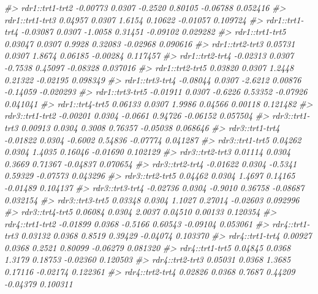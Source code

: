 \documentclass[
]{book}
\newenvironment{Shaded}{\begin{snugshade}}{\end{snugshade}}
\newcommand{\CommentTok}[1]{\textcolor[rgb]{0.56,0.35,0.01}{\textit{#1}}}
\begin{document}
\begin{Shaded}
\begin{Highlighting}[]
\CommentTok{\#\textgreater{} rdr1::trt1{-}trt2 {-}0.00773 0.0307 {-}0.2520 0.80105 {-}0.06788  0.052416}
\CommentTok{\#\textgreater{} rdr1::trt1{-}trt3  0.04957 0.0307  1.6154 0.10622 {-}0.01057  0.109724}
\CommentTok{\#\textgreater{} rdr1::trt1{-}trt4 {-}0.03087 0.0307 {-}1.0058 0.31451 {-}0.09102  0.029282}
\CommentTok{\#\textgreater{} rdr1::trt1{-}trt5  0.03047 0.0307  0.9928 0.32083 {-}0.02968  0.090616}
\CommentTok{\#\textgreater{} rdr1::trt2{-}trt3  0.05731 0.0307  1.8674 0.06185 {-}0.00284  0.117457}
\CommentTok{\#\textgreater{} rdr1::trt2{-}trt4 {-}0.02313 0.0307 {-}0.7538 0.45097 {-}0.08328  0.037016}
\CommentTok{\#\textgreater{} rdr1::trt2{-}trt5  0.03820 0.0307  1.2448 0.21322 {-}0.02195  0.098349}
\CommentTok{\#\textgreater{} rdr1::trt3{-}trt4 {-}0.08044 0.0307 {-}2.6212 0.00876 {-}0.14059 {-}0.020293}
\CommentTok{\#\textgreater{} rdr1::trt3{-}trt5 {-}0.01911 0.0307 {-}0.6226 0.53352 {-}0.07926  0.041041}
\CommentTok{\#\textgreater{} rdr1::trt4{-}trt5  0.06133 0.0307  1.9986 0.04566  0.00118  0.121482}
\CommentTok{\#\textgreater{} rdr3::trt1{-}trt2 {-}0.00201 0.0304 {-}0.0661 0.94726 {-}0.06152  0.057504}
\CommentTok{\#\textgreater{} rdr3::trt1{-}trt3  0.00913 0.0304  0.3008 0.76357 {-}0.05038  0.068646}
\CommentTok{\#\textgreater{} rdr3::trt1{-}trt4 {-}0.01822 0.0304 {-}0.6002 0.54836 {-}0.07774  0.041287}
\CommentTok{\#\textgreater{} rdr3::trt1{-}trt5  0.04262 0.0304  1.4035 0.16046 {-}0.01690  0.102129}
\CommentTok{\#\textgreater{} rdr3::trt2{-}trt3  0.01114 0.0304  0.3669 0.71367 {-}0.04837  0.070654}
\CommentTok{\#\textgreater{} rdr3::trt2{-}trt4 {-}0.01622 0.0304 {-}0.5341 0.59329 {-}0.07573  0.043296}
\CommentTok{\#\textgreater{} rdr3::trt2{-}trt5  0.04462 0.0304  1.4697 0.14165 {-}0.01489  0.104137}
\CommentTok{\#\textgreater{} rdr3::trt3{-}trt4 {-}0.02736 0.0304 {-}0.9010 0.36758 {-}0.08687  0.032154}
\CommentTok{\#\textgreater{} rdr3::trt3{-}trt5  0.03348 0.0304  1.1027 0.27014 {-}0.02603  0.092996}
\CommentTok{\#\textgreater{} rdr3::trt4{-}trt5  0.06084 0.0304  2.0037 0.04510  0.00133  0.120354}
\CommentTok{\#\textgreater{} rdr4::trt1{-}trt2 {-}0.01899 0.0368 {-}0.5166 0.60543 {-}0.09104  0.053061}
\CommentTok{\#\textgreater{} rdr4::trt1{-}trt3  0.03132 0.0368  0.8519 0.39429 {-}0.04074  0.103370}
\CommentTok{\#\textgreater{} rdr4::trt1{-}trt4  0.00927 0.0368  0.2521 0.80099 {-}0.06279  0.081320}
\CommentTok{\#\textgreater{} rdr4::trt1{-}trt5  0.04845 0.0368  1.3179 0.18753 {-}0.02360  0.120503}
\CommentTok{\#\textgreater{} rdr4::trt2{-}trt3  0.05031 0.0368  1.3685 0.17116 {-}0.02174  0.122361}
\CommentTok{\#\textgreater{} rdr4::trt2{-}trt4  0.02826 0.0368  0.7687 0.44209 {-}0.04379  0.100311}

\end{Highlighting}
\end{Shaded}
\end{document}
